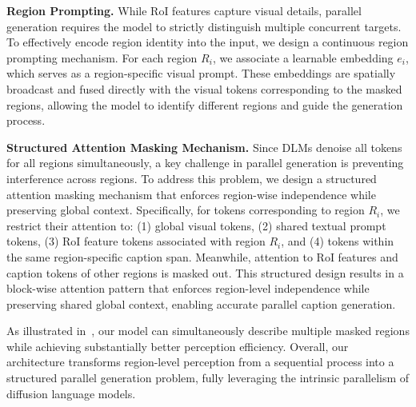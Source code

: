 \documentclass{llmxive}
\begin{document}
\noindent
\textbf{Region Prompting.}
While RoI features capture visual details, parallel generation requires the model to strictly distinguish multiple concurrent targets. To effectively encode region identity into the input, we design a continuous region prompting mechanism. 
%
For each region $R_i$, we associate a learnable embedding $e_i$, which serves as a region-specific visual prompt. 
%
These embeddings are spatially broadcast and fused directly with the visual tokens corresponding to the masked regions, allowing the model to identify different regions and guide the generation process.


\noindent
\textbf{Structured Attention Masking Mechanism.}
Since DLMs denoise all tokens for all regions simultaneously, a key challenge in parallel generation is preventing interference across regions. 
%
To address this problem, we design a structured attention masking mechanism that enforces region-wise independence while preserving global context. Specifically, for tokens corresponding to region $R_i$, we restrict their attention to: (1) global visual tokens, (2) shared textual prompt tokens, (3) RoI feature tokens associated with region $R_i$, and (4) tokens within the same region-specific caption span. Meanwhile, attention to RoI features and caption tokens of other regions is masked out. This structured design results in a block-wise attention pattern that enforces region-level independence while preserving shared global context, enabling accurate parallel caption generation.

As illustrated in~, our model can simultaneously describe multiple masked regions while achieving substantially better perception efficiency. Overall, our architecture transforms region-level perception from a sequential process into a structured parallel generation problem, fully leveraging the intrinsic parallelism of diffusion language models.
\end{document}
